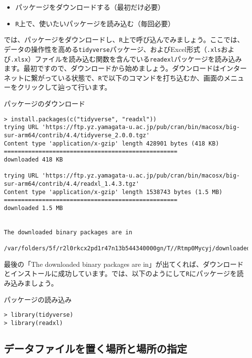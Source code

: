\begin{itemize}
  \item パッケージをダウンロードする（最初だけ必要）
  \item \texttt{R}上で、使いたいパッケージを読み込む（毎回必要）
\end{itemize}

では、パッケージをダウンロードし、\texttt{R}上で呼び込んでみましょう。ここでは、データの操作性を高める\verb|tidyverse|パッケージ、およびExcel形式（\verb|.xls|および\verb|.xlsx|）ファイルを読み込む関数を含んでいる\verb|readexl|パッケージを読み込みます。最初ですので、ダウンロードから始めましょう。ダウンロードはインターネットに繋がっている状態で、\texttt{R}で以下のコマンドを打ち込むか、画面のメニューをクリックして辿って行います。

\begin{itembox}[l]{パッケージのダウンロード}
\begin{verbatim}
> install.packages(c("tidyverse", "readxl"))
trying URL 'https://ftp.yz.yamagata-u.ac.jp/pub/cran/bin/macosx/big-sur-arm64/contrib/4.4/tidyverse_2.0.0.tgz'
Content type 'application/x-gzip' length 428901 bytes (418 KB)
==================================================
downloaded 418 KB

trying URL 'https://ftp.yz.yamagata-u.ac.jp/pub/cran/bin/macosx/big-sur-arm64/contrib/4.4/readxl_1.4.3.tgz'
Content type 'application/x-gzip' length 1538743 bytes (1.5 MB)
==================================================
downloaded 1.5 MB


The downloaded binary packages are in
	/var/folders/5f/r2l0rkcx2pd1r47n13b544340000gn/T//Rtmp0Mycyj/downloaded_packages
\end{verbatim}
\end{itembox}

最後の「The downloaded binary packages are in」が出てくれば、ダウンロードとインストールに成功しています。では、以下のようにして\texttt{R}にパッケージを読み込みましょう。

\begin{itembox}[l]{パッケージの読み込み}
\begin{verbatim}
> library(tidyverse)
> library(readxl)
\end{verbatim}
\end{itembox}

  \subsection{データファイルを置く場所と場所の指定}

